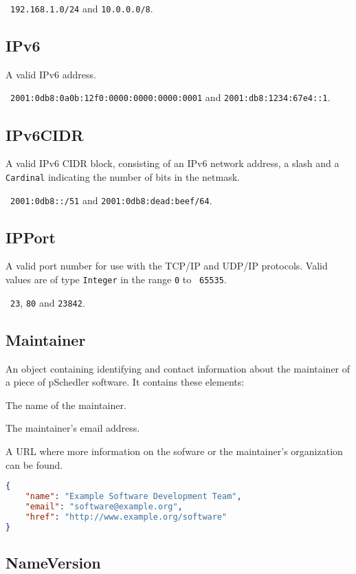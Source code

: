 \documentclass[10pt]{article}
\begin{document}
\example\ {\tt 192.168.1.0/24} and {\tt 10.0.0.0/8}.


\subsection{IPv6}
A valid IPv6 address.

\example\ {\tt  2001:0db8:0a0b:12f0:0000:0000:0000:0001} and {\tt 2001:db8:1234:67e4::1}.


\subsection{IPv6CIDR}
A valid IPv6 CIDR block, consisting of an IPv6 network address, a
slash and a {\tt Cardinal} indicating the number of bits in the
netmask.

\example\ {\tt 2001:0db8::/51} and {\tt 2001:0db8:dead:beef/64}.



\subsection{IPPort}
A valid port number for use with the TCP/IP and UDP/IP protocols.
Valid values are of type {\tt Integer} in the range {\tt 0} to {\tt
  65535}.

\example\ {\tt 23}, {\tt 80} and {\tt 23842}.


\subsection{Maintainer}

An object containing identifying and contact information about the
maintainer of a piece of pSchedler software.  It contains these
elements:

 The name of the maintainer.

 The maintainer's email address.

 A URL where more information on the sofware or
the maintainer's organization can be found.

\example
\begin{lstlisting}[language=json]
{
    "name": "Example Software Development Team",
    "email": "software@example.org",
    "href": "http://www.example.org/software"
}
\end{lstlisting}



\subsection{NameVersion}
\end{document}
